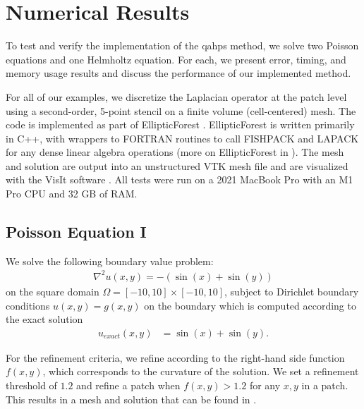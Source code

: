 \section{Numerical Results}
\label{sec:results}

To test and verify the implementation of the \gls{qahps} method, we solve two Poisson equations and one Helmholtz equation. For each, we present error, timing, and memory usage results and discuss the performance of our implemented method.

For all of our examples, we discretize the Laplacian operator at the patch level using a second-order, 5-point stencil on a finite volume (cell-centered) mesh. The code is implemented as part of EllipticForest \citep{chipman2024ellipticforest}. EllipticForest is written primarily in C++, with wrappers to FORTRAN routines to call FISHPACK and LAPACK \citep{anderson1999lapack} for any dense linear algebra operations (more on EllipticForest in ). The mesh and solution are output into an unstructured VTK mesh file \citep{kitware2006vtkBook} and are visualized with the VisIt software \citep{HPV:VisIt}. All tests were run on a 2021 MacBook Pro with an M1 Pro CPU and 32 GB of RAM.

\subsection{Poisson Equation I}
\label{sub:example_one}

We solve the following boundary value problem:
\begin{align}
    \nabla^2 u(x,y) = -(\sin(x) + \sin(y))
\end{align}
on the square domain $\Omega = [-10, 10] \times [-10, 10]$, subject to Dirichlet boundary conditions $u(x,y) = g(x,y)$ on the boundary which is computed according to the exact solution
\begin{align}
    u_{exact}(x,y) &= \sin(x) + \sin(y).
\end{align}

For the refinement criteria, we refine according to the right-hand side function $f(x,y)$, which corresponds to the curvature of the solution. We set a refinement threshold of $1.2$ and refine a patch when $f(x,y) > 1.2$ for any $x,y$ in a patch. This results in a mesh and solution that can be found in .

